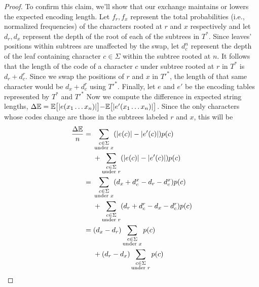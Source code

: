 \documentclass[10pt, twocolumn]{article}
\DeclarePairedDelimiter\length{\lvert}{\rvert}
\theoremstyle{prob}
\theoremstyle{definition}
\begin{document}
\begin{proof}
    To confirm this claim, we'll show that our exchange maintains or lowers the expected encoding length. Let $f_r, f_x$ represent the total probabilities (i.e., normalized frequencies) of the characters rooted at $r$ and $x$ respectively and let $d_r, d_x$ represent the depth of the root of each of the subtrees in $T^*$. Since leaves' positions within subtrees are unaffected by the swap, let $d_c^n$ represent the depth of the leaf containing character $c \in \Sigma$ within the subtree rooted at $n$. It follows that the length of the code of a character $c$ under subtree rooted at $r$ in $T^*$ is $d_r + d_c^r$. Since we swap the positions of $r$ and $x$ in $T'^*$, the length of that same character would be $d_x + d_c^r$ using $T'^*$. Finally, let $e$ and $e'$ be the encoding tables represented by $T^*$ and $T'^*$ Now we compute the difference in expected string lengths, $\Delta\mathbb{E} = \mathbb{E} \bigr[ \length{e(x_1\dots x_n)} \bigl] - \mathbb{E} \bigr[ \length{e'(x_1\dots x_n)} \bigl]$. Since the only characters whose codes change are those in the subtrees labeled $r$ and $x$, this will be
    \begin{align*}
            \frac{\Delta\mathbb{E}}{n}  &= \begin{aligned}[t]
                &\sum_{\substack{c \in \Sigma \\ \text{under } x}} (\length{e(c)}- \length{e'(c)})p(c) \\ 
                &+ \sum_{\substack{c \in \Sigma \\ \text{under } r}} (\length{e(c)} - \length{e'(c)})p(c)
            \end{aligned} \\
        &= \begin{aligned}[t] 
            &\sum_{\substack{c \in \Sigma \\ \text{under } x}} (d_x + d_c^x - d_r - d_c^x)p(c) \\ 
            &+ \sum_{\substack{c \in \Sigma \\ \text{under } r}} (d_r + d_c^r - d_x - d_c^r)p(c) 
            \end{aligned}\\
        &= \begin{aligned}[t] 
            &(d_x - d_r)\sum_{\substack{c \in \Sigma \\ \text{under } x}} p(c) \\
            &+ (d_r - d_x) \sum_{\substack{c \in \Sigma \\ \text{under } r}} p(c) 
            \end{aligned} \\

\end{align*}
\end{proof}
\end{document}
